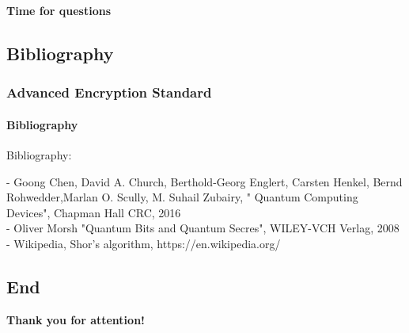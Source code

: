 \begin{frame}
	
	\begin{center}
		\Huge \textbf{Time for questions}
	\end{center}

\end{frame}
\subsection{Bibliography}
\begin{frame}
	\frametitle{Advanced Encryption Standard}
		\framesubtitle{Bibliography}
	{\normalsize 
	
	Bibliography:\\	
	\vspace{0,2cm}

{-  Goong Chen, David A. Church, Berthold-Georg Englert, Carsten Henkel, Bernd Rohwedder,Marlan O. Scully, M. Suhail Zubairy, " Quantum Computing Devices", Chapman Hall CRC, 2016}\\
\vspace{0,2cm}
{- Oliver Morsh "Quantum Bits and Quantum Secres", WILEY-VCH Verlag, 2008}\\
\vspace{0,2cm}
{- Wikipedia, Shor's algorithm, https://en.wikipedia.org/}\\

	}
\end{frame}

\subsection{End}
\begin{frame}
	
	\begin{center}
		\Huge \textbf{Thank you for attention!}
	\end{center}

\end{frame}
